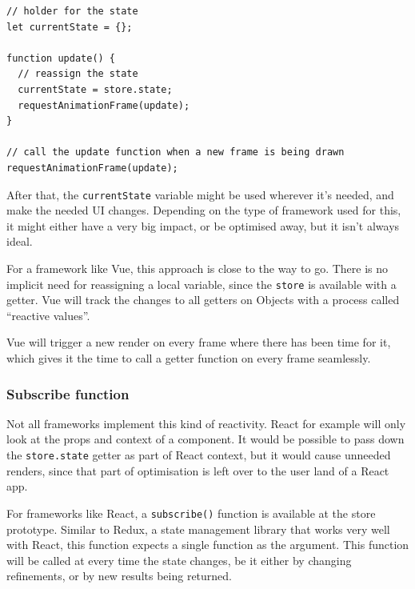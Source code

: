 \begin{minipage}{\linewidth}
\begin{lstlisting}[caption={Naive way to find out about changed state},label={lst:is-core-naive-subscribe}]
// holder for the state
let currentState = {};

function update() {
  // reassign the state
  currentState = store.state;
  requestAnimationFrame(update);
}

// call the update function when a new frame is being drawn
requestAnimationFrame(update);
\end{lstlisting}
\end{minipage}

After that, the {\tt currentState} variable might be used wherever it's needed, and make the needed UI changes. Depending on the type of framework used for this, it might either have a very big impact, or be optimised away, but it isn't always ideal.

For a framework like Vue\cite{vue-reactivity}, this approach is close to the way to go. There is no implicit need for reassigning a local variable, since the {\tt store} is available with a getter. Vue will track the changes to all getters on Objects with a process called ``reactive values''.

Vue will trigger a new render on every frame where there has been time for it, which gives it the time to call a getter function on every frame seamlessly. 

\subsubsection{Subscribe function}
\label{ssub:subscribe_function}

Not all frameworks implement this kind of reactivity. React for example will only look at the props and context of a component. It would be possible to pass down the {\tt store.state} getter as part of React context, but it would cause unneeded renders, since that part of optimisation is left over to the user land of a React app. 

For frameworks like React, a {\tt subscribe()} function is available at the store prototype. Similar to Redux\cite{redux-glossary-store}, a state management library that works very well with React, this function expects a single function as the argument. This function will be called at every time the state changes, be it either by changing refinements, or by new results being returned.


